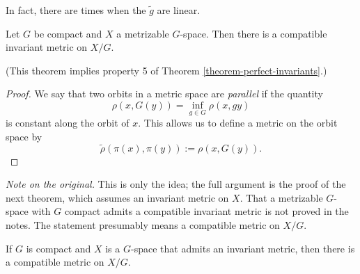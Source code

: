 In fact, there are times when the
$\tilde{g}$ are linear.

\begin{theorem}
\label{theorem-invariant-metric-quotient}
Let $G$ be compact and $X$ a metrizable
$G$-space. Then there is a compatible
invariant metric on $X/G$.
\end{theorem}

(This theorem implies property 5 of
Theorem
\ref{theorem-perfect-invariants}.)

\begin{proof}
We say that two orbits in a metric
space are {\it parallel} if the
quantity
$$
\rho(x,G(y))
=\inf_{g\in G}\rho(x,gy)
$$
is constant along the orbit of $x$.
This allows us to define a metric on
the orbit space by
$$
\tilde{\rho}(\pi(x),\pi(y))
:=\rho(x,G(y)).
$$
\end{proof}

\noindent
{\it Note on the original.} This is only
the idea; the full argument is the
proof of the next theorem, which assumes
an invariant metric on $X$. That a
metrizable $G$-space with $G$ compact
admits a compatible invariant metric is
not proved in the notes. The statement
presumably means a compatible metric on
$X/G$.

\begin{theorem}
\label{theorem-metric-on-orbit-space}
If $G$ is compact and $X$ is a
$G$-space that admits an invariant
metric, then there is a compatible
metric on $X/G$.
\end{theorem}

